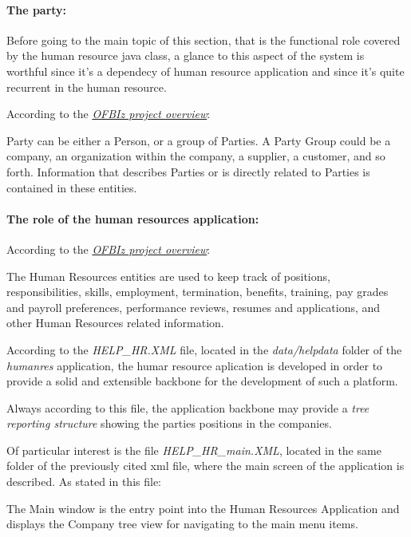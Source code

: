 \paragraph{The party:}
Before going to the main topic of this section, that is the functional role covered by the human resource java class, a glance to this aspect of the system is worthful since it's a dependecy of human resource application and since it's quite recurrent in the human resource.

According to the \href{https://ofbiz.apache.org/apache-ofbiz-project-overview.html}{\textit{OFBIz project overview}}:

Party can be either a Person, or a group of Parties. A Party Group could be a company, an organization within the company, a supplier, a customer, and so forth. Information that describes Parties or is directly related to Parties is contained in these entities.

\paragraph{The role of the human resources application:}

According to the \href{https://ofbiz.apache.org/apache-ofbiz-project-overview.html}{\textit{OFBIz project overview}}:

The Human Resources entities are used to keep track of positions, responsibilities, skills, employment, termination, benefits, training, pay grades and payroll preferences, performance reviews, resumes and applications, and other Human Resources related information.

According to the \textit{HELP\_HR.XML} file, located in the \textit{data/helpdata} folder of the \textit{humanres} application, the humar resource aplication is developed in order to provide a solid and extensible backbone for the development of such a platform.

Always according to this file, the application backbone may provide a \textit{tree reporting structure} showing the parties positions in the companies.

Of particular interest is the file \textit{HELP\_HR\_main.XML}, located in the same folder of the previously cited xml file, where the main screen of the application is described. As stated in this file:

The Main window is the entry point into the Human Resources Application and displays the Company tree view for navigating to the main menu items.


